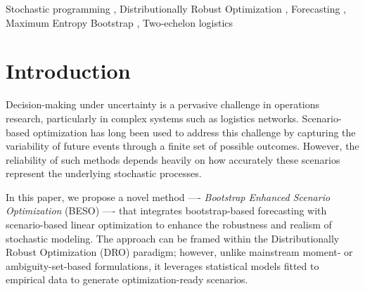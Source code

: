 \documentclass[a4paper,fleqn,3p,11pt,authoryear]{cas-sc}
\begin{document}


\begin{keywords}
	Stochastic programming \sep
	Distributionally Robust Optimization \sep
	Forecasting \sep
	Maximum Entropy Bootstrap \sep 
	Two-echelon logistics
\end{keywords}

\maketitle
\linespread{1.3}\selectfont

\section{Introduction} \label{Sec:intro}

Decision-making under uncertainty is a pervasive challenge in operations research, particularly in complex systems such as logistics networks. Scenario-based optimization has long been used to address this challenge by capturing the variability of future events through a finite set of possible outcomes. However, the reliability of such methods depends heavily on how accurately these scenarios represent the underlying stochastic processes.

In this paper, we propose a novel method —- {\em Bootstrap Enhanced Scenario Optimization} (BESO) —- that integrates bootstrap-based forecasting with scenario-based linear optimization to enhance the robustness and realism of stochastic modeling. The approach can be framed within the Distributionally Robust Optimization (DRO) paradigm; however, unlike mainstream moment- or ambiguity-set-based formulations, it leverages statistical models fitted to empirical data to generate optimization-ready scenarios.
\end{document}
